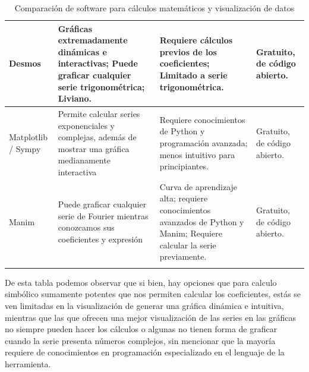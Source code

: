 \begin{longtable}{ | m{2cm} | m{4cm} | m{4cm} | m{3cm} | }
	Desmos & Gráficas extremadamente dinámicas e interactivas; Puede graficar cualquier serie trigonométrica; Liviano. & Requiere cálculos previos de los coeficientes; Limitado a serie trigonométrica. & Gratuito, de código abierto. \\ \hline
	Matplotlib / Sympy & Permite calcular series exponenciales y complejas, además de mostrar una gráfica medianamente interactiva & Requiere conocimientos de Python y programación avanzada; menos intuitivo para principiantes. & Gratuito, de código abierto. \\ \hline
	Manim & Puede graficar cualquier serie de Fourier mientras conozcamos sus coeficientes y expresión & Curva de aprendizaje alta; requiere conocimientos avanzados de Python y Manim; Requiere calcular la serie previamente. & Gratuito, de código abierto. \\ \hline
	\rowcolor{white}\caption{Comparación de software para cálculos matemáticos y visualización de datos} \label{tabla:Comparativa de los sitemas vistos en función de las series de Fourier} \\
\end{longtable}

De esta tabla podemos observar que si bien, hay opciones que para calculo simbólico sumamente potentes que nos permiten calcular los coeficientes, estás se ven limitadas en la visualización de generar una gráfica dinámica e intuitiva, mientras que las que ofrecen una mejor visualización de las series en las gráficas no siempre pueden hacer los cálculos o algunas no tienen forma de graficar cuando la serie presenta números complejos, sin mencionar que la mayoría requiere de conocimientos en programación especializado en el lenguaje de la herramienta.


